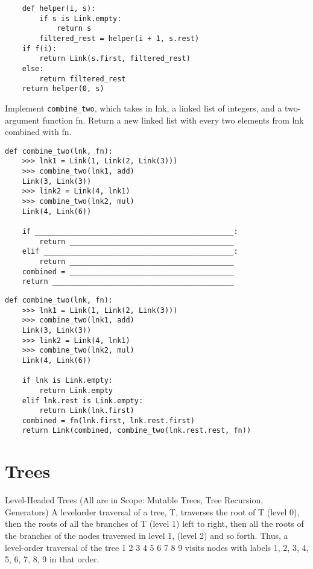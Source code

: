 \documentclass{exam}
\begin{document}
\begin{questions}
\begin{solution}
\begin{lstlisting}
	def helper(i, s):
		if s is Link.empty:
			return s
		filtered_rest = helper(i + 1, s.rest)
	if f(i):
		return Link(s.first, filtered_rest)
	else:
		return filtered_rest
	return helper(0, s)
\end{lstlisting}
\end{solution}

\begin{blocksection}
	Implement \lstinline{combine_two}, which takes in lnk, a linked list of integers, and a two-argument function fn. Return a new linked list with every two elements from lnk combined with fn.
\begin{lstlisting}
def combine_two(lnk, fn):
	>>> lnk1 = Link(1, Link(2, Link(3)))
	>>> combine_two(lnk1, add)
	Link(3, Link(3))
	>>> link2 = Link(4, lnk1)
	>>> combine_two(lnk2, mul)
	Link(4, Link(6))

	if ______________________________________________:
		return ______________________________________
	elif ____________________________________________:
		return ______________________________________
	combined = ______________________________________
	return __________________________________________
\end{lstlisting}
\end{blocksection}
\begin{solution}
\begin{lstlisting}
def combine_two(lnk, fn):
	>>> lnk1 = Link(1, Link(2, Link(3)))
	>>> combine_two(lnk1, add)
	Link(3, Link(3))
	>>> link2 = Link(4, lnk1)
	>>> combine_two(lnk2, mul)
	Link(4, Link(6))

	if lnk is Link.empty:
		return Link.empty
	elif lnk.rest is Link.empty:
		return Link(lnk.first)
	combined = fn(lnk.first, lnk.rest.first)
	return Link(combined, combine_two(lnk.rest.rest, fn))
\end{lstlisting}
\end{solution}
\section{Trees}

\begin{blocksection}
Level-Headed Trees (All are in Scope: Mutable Trees, Tree Recursion, Generators) A levelorder traversal of a tree, T, traverses the root of T (level 0), then the roots of all the branches of T (level 1)
left to right, then all the roots of the branches of the nodes traversed in level 1, (level 2) and so forth. Thus, a
level-order traversal of the tree
						1
					2   3   4
				5 	6	7	8	9
visits nodes with labels 1, 2, 3, 4, 5, 6, 7, 8, 9 in that order.


\end{blocksection}
\end{questions}
\end{document}
